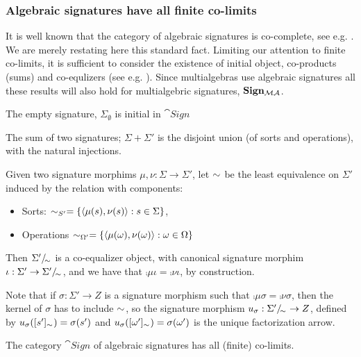 \subsubsection{Algebraic signatures have all finite co-limits}\label{sub:sign}
It is well known that the category of algebraic signatures is co-complete,
see e.g. \cite{fundamental1}. We are merely restating here this standard fact.
 Limiting our
attention to finite co-limits, 
it is sufficient to consider the existence of initial object, co-products (sums) and co-equlizers
(see e.g. \cite{cat}).
Since
multialgebras use algebraic signatures all these results will also hold
for multialgebric signatures, ${\bf Sign_{{\mathcal{MA}}}}$.

\begin{fact}
The empty signature, $\Sigma_{\emptyset}$ is initial in $\cat{Sign}$
\end{fact}

\begin{fact}
The sum of two signatures; $\Sigma + \Sigma'$ is the disjoint union (of sorts
and operations), with the natural injections.
\end{fact}

\begin{fact}
Given two signature morphims $\mu,\nu:\Sigma \to \Sigma'$, let $\sim_{}$ be the least equivalence on $\Sigma'$ induced by the relation with components:
	\begin{itemize}
	\item Sorts: $\sim_{S'}= \{ \langle \mu(s),\nu(s) \rangle: s \in \Sigma \}$,
	\item Operations $\sim_{\Omega'}= \{ \langle \mu(\omega), \nu(\omega) \rangle : \omega \in \Omega \}$
	\end{itemize} 

Then $\Sigma'/\!_{\sim_{}}$ is a co-equalizer object, with canonical
signature morphim $\iota: \Sigma' \to \Sigma'/\!_{\sim_{}}$,
and we have that $\comp{\mu}{\iota} =
\comp{\nu}{\iota}$, by construction.

Note that if $\sigma:\Sigma' \to Z$ is a signature morphism such that
$\comp{\mu}{\sigma}= \comp{\nu}{\sigma}$, then the kernel of $\sigma$ has to
include $\sim_{}$, so the signature morphism $u_{\sigma}:
\Sigma'/\!_{\sim_{}} \to Z$, defined by $u_{\sigma}([s']_{\sim_{}})=
\sigma(s')$ and $u_{\sigma}([\omega']_{\sim_{}})= \sigma(\omega')$ is the
unique factorization arrow.
\end{fact}

\begin{fact} \cite{fundamental1}
The category $\cat{Sign}$ of algebraic signatures  has all (finite) co-limits.
\end{fact}

